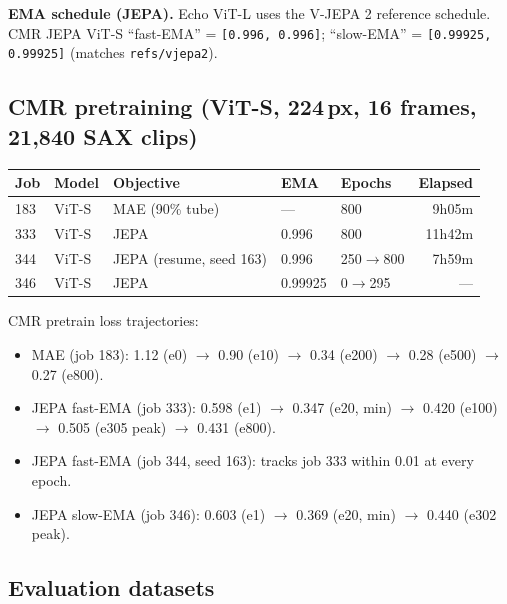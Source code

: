 \documentclass{article}
\begin{document}
\textbf{EMA schedule (JEPA).} Echo ViT-L uses the V-JEPA 2 reference schedule.
CMR JEPA ViT-S ``fast-EMA'' = \texttt{[0.996, 0.996]};
``slow-EMA'' = \texttt{[0.99925, 0.99925]} (matches \texttt{refs/vjepa2}).

\subsection{CMR pretraining (ViT-S, 224\,px, 16 frames, 21{,}840 SAX clips)}

\begin{center}
\begin{tabular}{lllllr}
\toprule
Job & Model & Objective & EMA & Epochs & Elapsed \\
\midrule
183 & ViT-S & MAE (90\% tube) & ---   & 800 & 9h05m \\
333 & ViT-S & JEPA            & 0.996 & 800 & 11h42m \\
344 & ViT-S & JEPA (resume, seed 163) & 0.996 & 250$\to$800 & 7h59m \\
346 & ViT-S & JEPA            & 0.99925 & 0$\to$295 & --- \\
\bottomrule
\end{tabular}
\end{center}

CMR pretrain loss trajectories:
\begin{itemize}
\item MAE (job 183): 1.12 (e0) $\to$ 0.90 (e10) $\to$ 0.34 (e200) $\to$ 0.28 (e500) $\to$ 0.27 (e800).
\item JEPA fast-EMA (job 333): 0.598 (e1) $\to$ 0.347 (e20, min) $\to$ 0.420 (e100) $\to$ 0.505 (e305 peak) $\to$ 0.431 (e800).
\item JEPA fast-EMA (job 344, seed 163): tracks job 333 within 0.01 at every epoch.
\item JEPA slow-EMA (job 346): 0.603 (e1) $\to$ 0.369 (e20, min) $\to$ 0.440 (e302 peak).
\end{itemize}

\subsection{Evaluation datasets}
\end{document}
